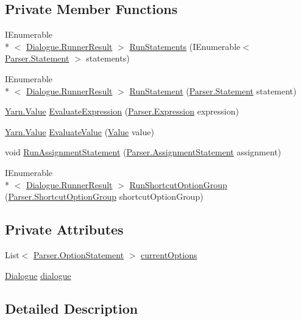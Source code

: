 \subsection*{Private Member Functions}
\begin{DoxyCompactItemize}
\item 
I\-Enumerable\\*
$<$ \hyperlink{a00083}{Dialogue.\-Runner\-Result} $>$ \hyperlink{a00097_aa436557ec45c8e98d194d9af139d9170}{Run\-Statements} (I\-Enumerable$<$ \hyperlink{a00090}{Parser.\-Statement} $>$ statements)
\item 
I\-Enumerable\\*
$<$ \hyperlink{a00083}{Dialogue.\-Runner\-Result} $>$ \hyperlink{a00097_a4a0f51fa1a54f8df77557cab086e43b7}{Run\-Statement} (\hyperlink{a00090}{Parser.\-Statement} statement)
\item 
\hyperlink{a00100}{Yarn.\-Value} \hyperlink{a00097_ac57271c72da4ec456a32c94d951c8b65}{Evaluate\-Expression} (\hyperlink{a00054}{Parser.\-Expression} expression)
\item 
\hyperlink{a00100}{Yarn.\-Value} \hyperlink{a00097_a352ca6c227f278419b252bc46ba30d0d}{Evaluate\-Value} (\hyperlink{a00100}{Value} value)
\item 
void \hyperlink{a00097_a217c6205821aff5ba31daeb8b3bf2846}{Run\-Assignment\-Statement} (\hyperlink{a00033}{Parser.\-Assignment\-Statement} assignment)
\item 
I\-Enumerable\\*
$<$ \hyperlink{a00083}{Dialogue.\-Runner\-Result} $>$ \hyperlink{a00097_a231488eace774d92f5c55034d075016d}{Run\-Shortcut\-Option\-Group} (\hyperlink{a00085}{Parser.\-Shortcut\-Option\-Group} shortcut\-Option\-Group)
\end{DoxyCompactItemize}
\subsection*{Private Attributes}
\begin{DoxyCompactItemize}
\item 
List$<$ \hyperlink{a00075}{Parser.\-Option\-Statement} $>$ \hyperlink{a00097_a1ff25426f4da4236acc741bbbb8c0d56}{current\-Options}
\item 
\hyperlink{a00050}{Dialogue} \hyperlink{a00097_aa4f386822db0dee7a07079271cb968a4}{dialogue}
\end{DoxyCompactItemize}


\subsection{Detailed Description}


